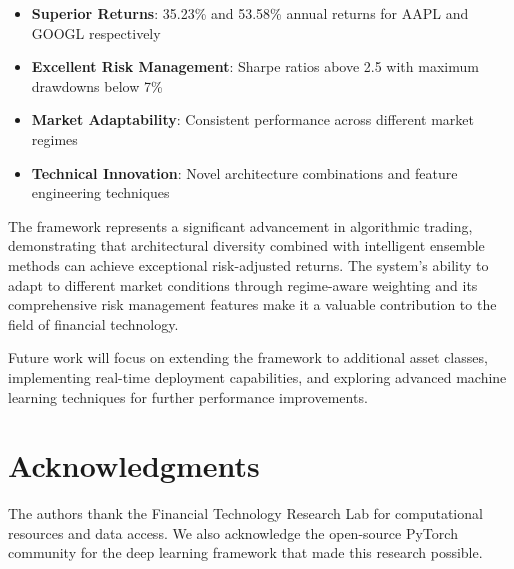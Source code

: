 \documentclass[10pt,twocolumn]{article}
\begin{document}
\begin{itemize}[itemsep=1pt]
\item \textbf{Superior Returns}: 35.23\% and 53.58\% annual returns for AAPL and GOOGL respectively
\item \textbf{Excellent Risk Management}: Sharpe ratios above 2.5 with maximum drawdowns below 7\%
\item \textbf{Market Adaptability}: Consistent performance across different market regimes
\item \textbf{Technical Innovation}: Novel architecture combinations and feature engineering techniques
\end{itemize}

The framework represents a significant advancement in algorithmic trading, demonstrating that architectural diversity combined with intelligent ensemble methods can achieve exceptional risk-adjusted returns. The system's ability to adapt to different market conditions through regime-aware weighting and its comprehensive risk management features make it a valuable contribution to the field of financial technology.

Future work will focus on extending the framework to additional asset classes, implementing real-time deployment capabilities, and exploring advanced machine learning techniques for further performance improvements.

\section*{Acknowledgments}

The authors thank the Financial Technology Research Lab for computational resources and data access. We also acknowledge the open-source PyTorch community for the deep learning framework that made this research possible.
\end{document}
